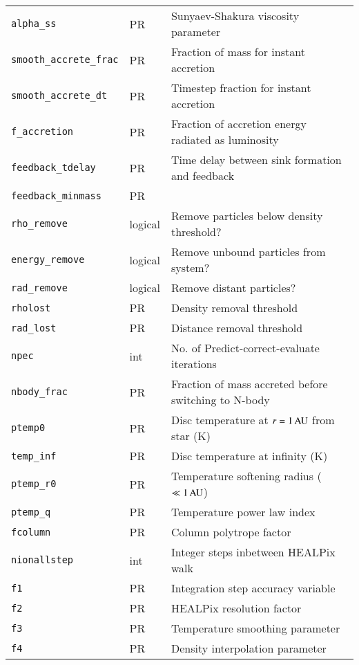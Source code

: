 \documentclass[a4paper]{article}
\newcommand{\var}[1]{\texttt{#1}}
\begin{document}
\begin{center}
\begin{supertabular}{|p{3cm}|p{2cm}|p{8cm}|}
\var{alpha\_ss}       & PR       & Sunyaev-Shakura viscosity parameter \\
\var{smooth\_accrete\_frac} & PR & Fraction of mass for instant accretion \\
\var{smooth\_accrete\_dt}   & PR & Timestep fraction for instant accretion \\
\var{f\_accretion}    & PR      & Fraction of accretion energy radiated as luminosity \\
\var{feedback\_tdelay} & PR     & Time delay between sink formation and feedback\\
\var{feedback\_minmass} & PR    & \\ \hline
\var{rho\_remove}    & logical  & Remove particles below density threshold? \\
\var{energy\_remove} & logical  & Remove unbound particles from system? \\
\var{rad\_remove}    & logical  & Remove distant particles? \\
\var{rholost}        & PR       & Density removal threshold \\
\var{rad\_lost}      & PR       & Distance removal threshold \\ \hline
\var{npec}           & int      & No. of Predict-correct-evaluate iterations \\
\var{nbody\_frac}    & PR       & Fraction of mass accreted before switching to N-body \\ \hline
\var{ptemp0}         & PR       & Disc temperature at $r = 1\,{\rm AU}$ from star (K) \\
\var{temp\_inf}      & PR       & Disc temperature at infinity (K) \\
\var{ptemp\_r0}      & PR       & Temperature softening radius ($\ll 1\,{\rm AU}$) \\
\var{ptemp\_q}       & PR       & Temperature power law index \\
\var{fcolumn}        & PR       & Column polytrope factor \\ \hline
\var{nionallstep}    & int      & Integer steps inbetween HEALPix walk \\
\var{f1}             & PR       & Integration step accuracy variable \\
\var{f2}             & PR       & HEALPix resolution factor \\
\var{f3}             & PR       & Temperature smoothing parameter \\
\var{f4}             & PR       & Density interpolation parameter \\

\end{supertabular}
\end{center}
\end{document}
